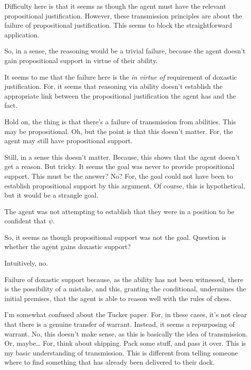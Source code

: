 \documentclass[10pt]{article}
\begin{document}
\begin{note}
  Difficulty here is that it seems as though the agent must have the relevant propositional justification.
  However, these transmission principles are about the failure of propositional justification.
  This seems to block the straightforward application.

  So, in a sense, the reasoning would be a trivial failure, because the agent doesn't gain propositional support in virtue of their ability.

  It seems to me that the failure here is the \emph{in virtue of} requirement of doxastic justification.
  For, it seems that reasoning via ability doesn't establish the appropriate link between the propositional justification the agent has and the fact.

  Hold on, the thing is that there's a failure of transmission from abilities.
  This may be propositional.
  Oh, but the point is that this doesn't matter.
  For, the agent may still have propositional support.

  Still, in a sense this doesn't matter.
  Because, this shows that the agent doesn't get a reason.
  But tricky.
  It seems the goal was never to provide propositional support.
  This must be the answer? No?
  For, the goal could not have been to establish propositional support by this argument.
  Of course, this is hypothetical, but it would be a strangle goal.

  The agent was not attempting to establish that they were in a position to be confident that \(\psi\).

  So, it seems as though propositional support was not the goal.
  Question is whether the agent gains doxastic support?

  Intuitively, no.

  Failure of doxastic support because, as the ability has not been witnessed, there is the possibility of a mistake, and this, granting the conditional, undermines the initial premises, that the agent is able to reason well with the rules of chess.

  I'm somewhat confused about the Tucker paper.
  For, in these cases, it's not clear that there is a genuine transfer of warrant.
  Instead, it seems a repurposing of warrant.
  No, this doesn't make sense, as this is basically the idea of transmission.
  Or, maybe\dots
  For, think about shipping.
  Pack some stuff, and pass it over.
  This is my basic understanding of transmission.
  This is different from telling someone where to find something that has already been delivered to their dock.


\end{note}
\end{document}
